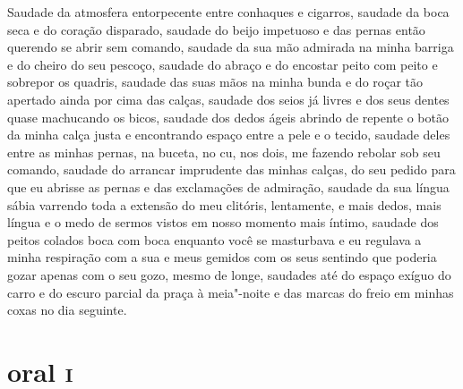 Saudade da atmosfera entorpecente entre conhaques e cigarros, saudade da
boca seca e do coração disparado, saudade do beijo impetuoso e das
pernas então querendo se abrir sem comando, saudade da sua mão admirada
na minha barriga e do cheiro do seu pescoço, saudade do abraço e do
encostar peito com peito e sobrepor os quadris, saudade das suas mãos na
minha bunda e do roçar tão apertado ainda por cima das calças, saudade
dos seios já livres e dos seus dentes quase machucando os bicos, saudade
dos dedos ágeis abrindo de repente o botão da minha calça justa e
encontrando espaço entre a pele e o tecido, saudade deles entre as
minhas pernas, na buceta, no cu, nos dois, me fazendo rebolar sob seu
comando, saudade do arrancar imprudente das minhas calças, do seu pedido
para que eu abrisse as pernas e das exclamações de admiração, saudade da
sua língua sábia varrendo toda a extensão do meu clitóris, lentamente, e
mais dedos, mais língua e o medo de sermos vistos em nosso momento mais
íntimo, saudade dos peitos colados boca com boca enquanto você se
masturbava e eu regulava a minha respiração com a sua e meus gemidos com
os seus sentindo que poderia gozar apenas com o seu gozo, mesmo de
longe, saudades até do espaço exíguo do carro e do escuro parcial da
praça à meia"-noite e das marcas do freio em minhas coxas no dia
seguinte.

\chapter{ oral \textsc{i} }

